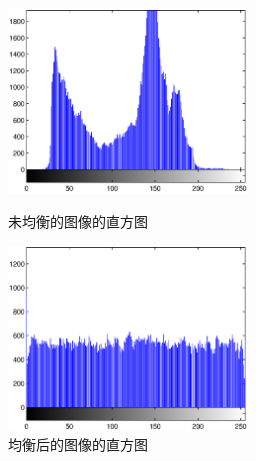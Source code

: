 \documentclass[a4paper,10pt]{article}
\theoremstyle{definition}
\theoremstyle{plain}
\begin{document}
\begin{figure}
\begin{minipage}[h]{0.5\linewidth}
\centering
\includegraphics[width=2.5in]{unequalized.eps}
\caption{未均衡的图像的直方图}
\label{fig:a}
\end{minipage}%
\begin{minipage}[h]{0.5\linewidth}
\centering
\includegraphics[width=2.5in]{equalized.eps}
\caption{均衡后的图像的直方图}
\label{fig:b}
\end{minipage}
\end{figure}


\end{document}
